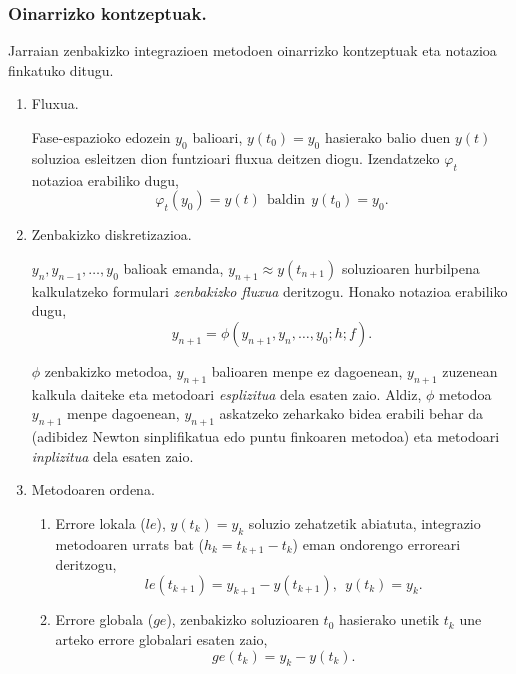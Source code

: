 \subsubsection*{Oinarrizko kontzeptuak.}  
Jarraian zenbakizko integrazioen metodoen oinarrizko kontzeptuak eta notazioa finkatuko ditugu.
\begin{enumerate}
\item Fluxua.

Fase-espazioko edozein $y_0$ balioari, $y(t_0)=y_0$ hasierako balio duen $y(t)$ soluzioa esleitzen dion funtzioari fluxua deitzen diogu. Izendatzeko $\varphi_t$ notazioa erabiliko dugu,
\begin{equation*}
\label{eq:fluxua}
\varphi_t(y_0)=y(t) \ \ \mbox{baldin}  \ \  y(t_0)=y_0.
\end{equation*}

\item Zenbakizko diskretizazioa.

$y_{n},y_{n-1},\dots ,y_0$ balioak emanda, $y_{n+1}\approx y(t_{n+1})$ soluzioaren hurbilpena kalkulatzeko formulari \emph{zenbakizko fluxua} deritzogu. Honako notazioa erabiliko dugu,
\begin{equation*}\label{eq:204}
y_{n+1}=\phi(y_{n+1},y_{n},\dots,y_0;h;f).
\end{equation*}

$\phi$ zenbakizko metodoa, $y_{n+1}$ balioaren menpe ez dagoenean, $y_{n+1}$ zuzenean kalkula daiteke eta metodoari \emph{esplizitua} dela esaten zaio. Aldiz, $\phi$ metodoa $y_{n+1}$ menpe dagoenean, $y_{n+1}$ askatzeko zeharkako bidea erabili behar da (adibidez Newton sinplifikatua edo puntu finkoaren metodoa) eta metodoari \emph{inplizitua} dela esaten zaio.  

\item Metodoaren ordena.

\begin{enumerate}
\item Errore lokala ($le$), $y(t_k)=y_k$ soluzio zehatzetik abiatuta, integrazio metodoaren urrats bat ($h_k=t_{k+1}-t_k$) eman ondorengo erroreari deritzogu,
\begin{equation*}
\label{eq:le}
le(t_{k+1})=y_{k+1}-y(t_{k+1}), \ \ y(t_k)=y_k.
\end{equation*}   


\item Errore globala ($ge$), zenbakizko soluzioaren $t_0$ hasierako unetik $t_k$ une arteko errore globalari esaten zaio,
\begin{equation*}
 \label{eq:ge}
ge(t_k)=y_k-y(t_k).
\end{equation*}


\end{enumerate}
\end{enumerate}
